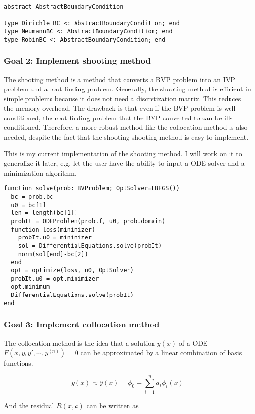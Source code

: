 \documentclass[a4paper,11pt,onecolumn]{article}
\begin{document}
\begin{lstlisting}[mathescape=true]
abstract AbstractBoundaryCondition

type DirichletBC <: AbstractBoundaryCondition; end
type NeumannBC <: AbstractBoundaryCondition; end
type RobinBC <: AbstractBoundaryCondition; end
\end{lstlisting}

\subsubsection{Goal 2: Implement shooting method}
The shooting method is a method that converts a BVP problem into an IVP problem and a root finding
problem. Generally, the shooting method is efficient in simple problems because it does not need
a discretization matrix. This reduces the memory overhead. The drawback is that even if the BVP problem
is well-conditioned, the root finding problem that the BVP converted to can be ill-conditioned.
Therefore, a more robust method like the collocation method is also needed, despite the fact that
the shooting shooting method is easy to implement.

This is my current implementation of the shooting method. I will work on it to generalize it
later, e.g. let the user have the ability to input a ODE solver and a minimization algorithm.

\begin{lstlisting}[mathescape=true]
function solve(prob::BVProblem; OptSolver=LBFGS())
  bc = prob.bc
  u0 = bc[1]
  len = length(bc[1])
  probIt = ODEProblem(prob.f, u0, prob.domain)
  function loss(minimizer)
    probIt.u0 = minimizer
    sol = DifferentialEquations.solve(probIt)
    norm(sol[end]-bc[2])
  end
  opt = optimize(loss, u0, OptSolver)
  probIt.u0 = opt.minimizer
  opt.minimum
  DifferentialEquations.solve(probIt)
end
\end{lstlisting}

\subsubsection{Goal 3: Implement collocation method}
The collocation method is the idea that a solution $y(x)$ of a ODE $F(x, y, y', \cdots, y^{(n)}) = 0$
can be approximated by a linear combination of basis functions.

\[y(x) \approx \hat{y}(x) = \phi_0 + \sum_{i=1}^na_i\phi_i(x)\]

And the residual $R(x,a)$ can be written as
\end{document}
